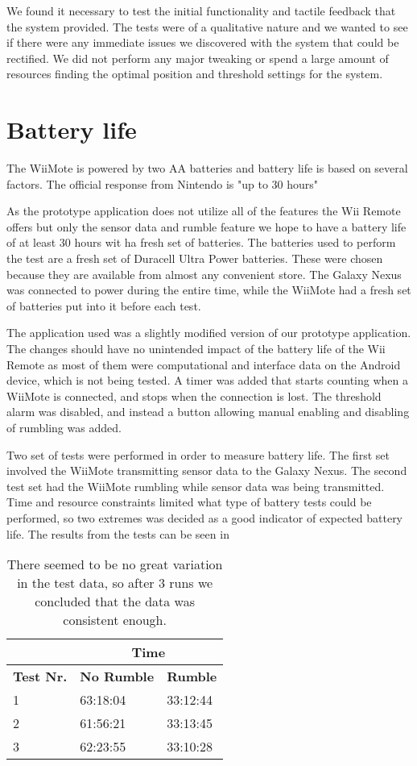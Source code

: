 We found it necessary to test the initial functionality and tactile feedback that the system provided. The tests were of a qualitative nature and we wanted to see if there were any immediate issues we discovered with the system that could be rectified. We did not perform any major tweaking or spend a large amount of resources finding the optimal position and threshold settings for the system. 

\section{Battery life}
The WiiMote is powered by two AA batteries and battery life is based on several factors. The official response from Nintendo is "up to 30 hours" \cite{wiiBattery}

As the prototype application does not utilize all of the features the Wii Remote offers but only the sensor data and rumble feature we hope to have a battery life of at least 30 hours wit ha fresh set of batteries. The batteries used to perform the test are a fresh set of Duracell Ultra Power batteries. These were chosen because they are available from almost any convenient store. The Galaxy Nexus was connected to power during the entire time, while the WiiMote had a fresh set of batteries put into it before each test.

The application used was a slightly modified version of our prototype application. The changes should have no unintended impact of the battery life of the Wii Remote as most of them were computational and interface data on the Android device, which is not being tested. A timer was added that starts counting when a WiiMote is connected, and stops when the connection is lost. The threshold alarm was disabled, and instead a button allowing manual enabling and disabling of rumbling was added.

Two set of tests were performed in order to measure battery life. The first set involved the WiiMote transmitting sensor data to the Galaxy Nexus. The second test set had the WiiMote rumbling while sensor data was being transmitted. Time and resource constraints limited what type of battery tests could be performed, so two extremes was decided as a good indicator of expected battery life. The results from the tests can be seen in %

\begin{table}[h]
\centering
\setlength{\extrarowheight}{0,2cm}
\begin{tabular}{p{2cm}|p{4.75cm}|p{4.75cm}|}
\cline{2-3}
&\multicolumn{2}{c|}{\textbf{Time}}\\ \hline
\textbf{Test Nr.} &\textbf{No Rumble} & \textbf{Rumble} \\ \hline
1 & 63:18:04 & 33:12:44 \\ \hline
2 & 61:56:21 & 33:13:45 \\ \hline
3 & 62:23:55 & 33:10:28 \\ \hline
\end{tabular}
\caption{There seemed to be no great variation in the test data, so after 3 runs we concluded that the data was consistent enough.}
\label{}
\end{table}

